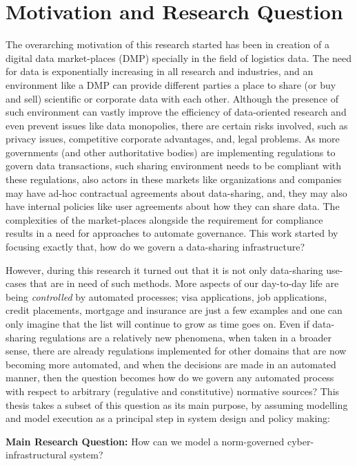 \section{Motivation and Research Question}
The overarching motivation of this research started has been in creation of a digital data market-places (DMP) specially in the field of logistics data. The need for data is exponentially increasing in all research and industries, and an environment like a DMP can provide different parties a place to share (or buy and sell) scientific or corporate data with each other. Although the presence of such environment can vastly improve the efficiency of data-oriented research and even prevent issues like data monopolies, there are certain risks involved, such as privacy issues, competitive corporate advantages, and, legal problems. As more governments (and other authoritative bodies) are implementing regulations to govern data transactions, such sharing environment needs to be compliant with these regulations, also actors in these markets like organizations and companies may have ad-hoc contractual agreements about data-sharing, and, they may also have internal policies like user agreements about how they can share data. The complexities of the market-places alongside the requirement for compliance results in a need for approaches to automate governance. This work started by focusing exactly that, how do we govern a data-sharing infrastructure? 


However, during this research it turned out that it is not only data-sharing use-cases that are in need of such methods. More aspects of our day-to-day life are being \textit{controlled} by automated processes; visa applications, job applications, credit placements, mortgage and insurance are just a few examples and one can only imagine that the list will continue to grow as time goes on. Even if data-sharing regulations are a relatively new phenomena, when taken in a broader sense, there are already regulations implemented for other domains that are now becoming more automated, and when the decisions are made in an automated manner, then the question becomes how do we govern any automated process with respect to arbitrary (regulative and constitutive) normative sources? This thesis takes a subset of this question as its main purpose, by assuming modelling and model execution as a principal step in system design and policy making:


\textbf{Main Research Question:} How can we model a norm-governed cyber-infrastructural system?



